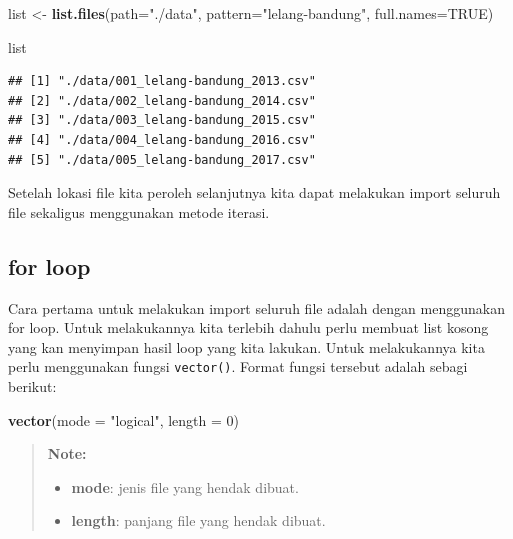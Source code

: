 \documentclass[]{book}
\newenvironment{Shaded}{\begin{snugshade}}{\end{snugshade}}
\newcommand{\KeywordTok}[1]{\textcolor[rgb]{0.13,0.29,0.53}{\textbf{#1}}}
\newcommand{\DataTypeTok}[1]{\textcolor[rgb]{0.13,0.29,0.53}{#1}}
\newcommand{\DecValTok}[1]{\textcolor[rgb]{0.00,0.00,0.81}{#1}}
\newcommand{\StringTok}[1]{\textcolor[rgb]{0.31,0.60,0.02}{#1}}
\newcommand{\OtherTok}[1]{\textcolor[rgb]{0.56,0.35,0.01}{#1}}
\newcommand{\NormalTok}[1]{#1}
\providecommand{\tightlist}{%
  \setlength{\itemsep}{0pt}\setlength{\parskip}{0pt}}
\begin{document}
\begin{Shaded}
\begin{Highlighting}[]
\NormalTok{list <-}\StringTok{ }\KeywordTok{list.files}\NormalTok{(}\DataTypeTok{path=}\StringTok{"./data"}\NormalTok{, }\DataTypeTok{pattern=}\StringTok{"lelang-bandung"}\NormalTok{, }\DataTypeTok{full.names=}\OtherTok{TRUE}\NormalTok{)}

\NormalTok{list}
\end{Highlighting}
\end{Shaded}

\begin{verbatim}
## [1] "./data/001_lelang-bandung_2013.csv"
## [2] "./data/002_lelang-bandung_2014.csv"
## [3] "./data/003_lelang-bandung_2015.csv"
## [4] "./data/004_lelang-bandung_2016.csv"
## [5] "./data/005_lelang-bandung_2017.csv"
\end{verbatim}

Setelah lokasi file kita peroleh selanjutnya kita dapat melakukan import
seluruh file sekaligus menggunakan metode iterasi.

\subsection{for loop}\label{for-loop-1}

Cara pertama untuk melakukan import seluruh file adalah dengan
menggunakan for loop. Untuk melakukannya kita terlebih dahulu perlu
membuat list kosong yang kan menyimpan hasil loop yang kita lakukan.
Untuk melakukannya kita perlu menggunakan fungsi \texttt{vector()}.
Format fungsi tersebut adalah sebagi berikut:

\begin{Shaded}
\begin{Highlighting}[]
\KeywordTok{vector}\NormalTok{(}\DataTypeTok{mode =} \StringTok{"logical"}\NormalTok{, }\DataTypeTok{length =} \DecValTok{0}\NormalTok{)}
\end{Highlighting}
\end{Shaded}

\begin{quote}
\textbf{Note: }

\begin{itemize}
\tightlist
\item
  \textbf{mode}: jenis file yang hendak dibuat.
\item
  \textbf{length}: panjang file yang hendak dibuat.
\end{itemize}
\end{quote}
\end{document}
